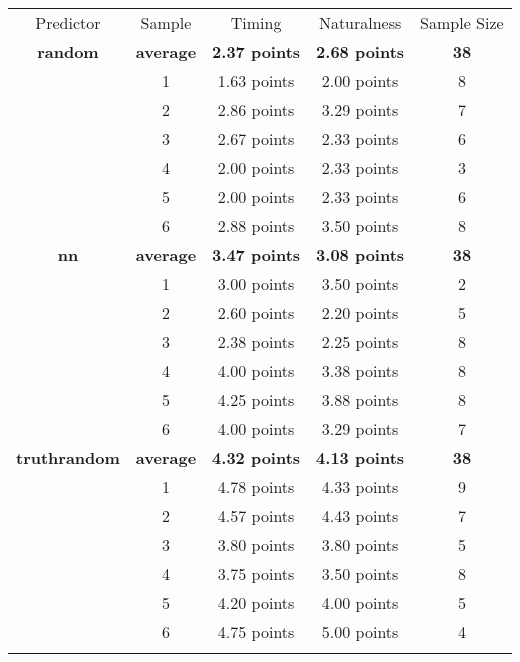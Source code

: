 \begin{tabular}{ccccc}
\hline\noalign{\smallskip}
Predictor & Sample & Timing & Naturalness & Sample Size \\
\noalign{\smallskip}\svhline\noalign{\smallskip}
\bf{random} & \bf{average} & \bf{2.37 points} & \bf{2.68 points} & \bf{38}\\
& 1 & 1.63 points & 2.00 points & 8\\
& 2 & 2.86 points & 3.29 points & 7\\
& 3 & 2.67 points & 2.33 points & 6\\
& 4 & 2.00 points & 2.33 points & 3\\
& 5 & 2.00 points & 2.33 points & 6\\
& 6 & 2.88 points & 3.50 points & 8\\
\noalign{\smallskip}\hline\noalign{\smallskip}
\bf{nn} & \bf{average} & \bf{3.47 points} & \bf{3.08 points} & \bf{38}\\
& 1 & 3.00 points & 3.50 points & 2\\
& 2 & 2.60 points & 2.20 points & 5\\
& 3 & 2.38 points & 2.25 points & 8\\
& 4 & 4.00 points & 3.38 points & 8\\
& 5 & 4.25 points & 3.88 points & 8\\
& 6 & 4.00 points & 3.29 points & 7\\
\noalign{\smallskip}\hline\noalign{\smallskip}
\bf{truthrandom} & \bf{average} & \bf{4.32 points} & \bf{4.13 points} & \bf{38}\\
& 1 & 4.78 points & 4.33 points & 9\\
& 2 & 4.57 points & 4.43 points & 7\\
& 3 & 3.80 points & 3.80 points & 5\\
& 4 & 3.75 points & 3.50 points & 8\\
& 5 & 4.20 points & 4.00 points & 5\\
& 6 & 4.75 points & 5.00 points & 4 \\
\noalign{\smallskip}\hline\noalign{\smallskip}
\end{tabular}
